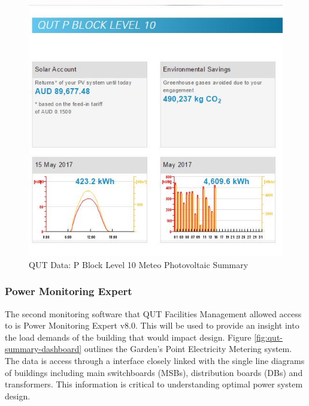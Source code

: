 \begin{figure}[H]
	\hfill\includegraphics[width = 150mm]{images/metering/meteo/lvl10-summary-page}\hspace*{\fill}
	\caption{QUT Data: P Block Level 10 Meteo Photovoltaic Summary} 
	\label{fig:qut-lvl10-meteo-summary}
\end{figure}

\subsubsection{Power Monitoring Expert}

The second monitoring software that QUT Facilities Management allowed access to is Power Monitoring Expert v8.0. This will be used to provide an insight into the load demands of the building that would impact design. Figure \ref{fig:qut-summary-dashboard} outlines the Garden's Point Electricity Metering system. The data is access through a interface closely linked with the single line diagrams of buildings including main switchboards (MSBs), distribution boards (DBs) and transformers. This information is critical to understanding optimal power system design.   

